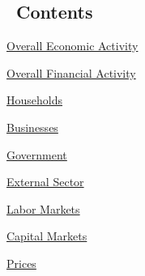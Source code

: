 \documentclass{report}
\begin{document}
\begin{minipage}{0.34\textwidth}
\subsection*{\hyperlink{toc}{\faList}\color{black!70} \ {\seriffont Contents}}
\hypertarget{toc}{}
\begin{description}


\item {\hyperref[sec:oea]{Overall Economic Activity}}

\item {\hyperref[sec:ofa]{Overall Financial Activity}}

\item {\hyperref[sec:hh]{Households}}

\item {\hyperref[sec:bus]{Businesses}}

\item {\hyperref[sec:gov]{Government}}

\item {\hyperref[sec:ext]{External Sector}}

\item {\hyperref[sec:lab]{Labor Markets}}

\item {\hyperref[sec:cap]{Capital Markets}}

\item {\hyperref[sec:pr]{Prices}}



\end{description}
\end{minipage}
\end{document}
